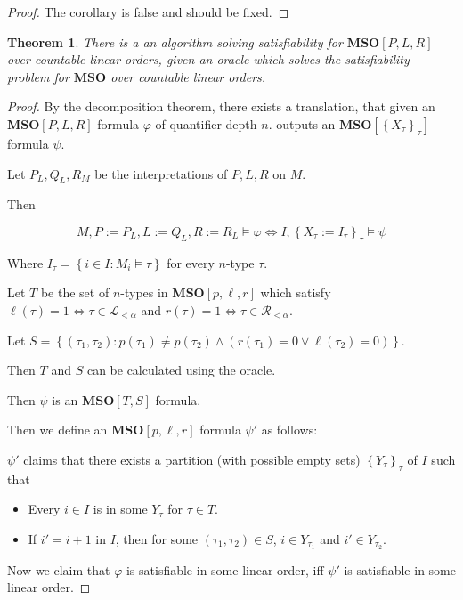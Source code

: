 \documentclass{article}
\newtheorem{theorem}{Theorem}
\newcommand{\braces}[1]{\left\{ {#1} \right\}}
\newcommand{\setcomp}[1]{\braces{#1}}
\newcommand{\mso}{\mathbf{MSO}}
\begin{document}
\begin{proof}
  The corollary is false and should be fixed.
\end{proof}

\begin{theorem}
  There is a an algorithm solving satisfiability for $\mso[P, L, R]$ over countable linear orders,
  given an oracle which solves the satisfiability problem for $\mso$ over countable linear orders.
\end{theorem}

\begin{proof}
  By the decomposition theorem, there exists a translation,
  that given an $\mso[P, L, R]$ formula $\varphi$ of quantifier-depth $n$.
  outputs an $\mso[\setcomp{X_\tau}_\tau]$ formula $\psi$.

  Let $P_L, Q_L, R_M$ be the interpretations of $P, L, R$ on $M$.

  Then

  $$
    M, P := P_L, L := Q_L, R := R_L \models \varphi \iff I, \setcomp{X_\tau := I_\tau}_\tau \models \psi
  $$

  Where $I_\tau = \setcomp{i \in I : M_i \models \tau}$ for every $n$-type $\tau$.

  Let $T$ be the set of $n$-types in $\mso[p, \ell, r]$ which satisfy
  $\ell(\tau) = 1 \iff \tau \in \mathcal{L}_{< \alpha}$ and $r(\tau) = 1 \iff \tau \in \mathcal{R}_{< \alpha}$.

  Let $S = \setcomp{(\tau_1, \tau_2) : p(\tau_1) \ne p(\tau_2) \land (r(\tau_1) = 0 \lor \ell(\tau_2) = 0)}$.

  Then $T$ and $S$ can be calculated using the oracle.

  Then $\psi$ is an $\mso[T, S]$ formula.

  Then we define an $\mso[p, \ell, r]$ formula $\psi'$ as follows:

  $\psi'$ claims that there exists a partition (with possible empty sets) $\setcomp{Y_\tau}_{\tau}$ of $I$ such that
  \begin{itemize}
    \item Every $i \in I$ is in some $Y_\tau$ for $\tau \in T$.
    \item If $i' = i+1$ in $I$, then for some $(\tau_1, \tau_2) \in S$, $i \in Y_{\tau_1}$ and $i' \in Y_{\tau_2}$.
  \end{itemize}

  Now we claim that $\varphi$ is satisfiable in some linear order, iff $\psi'$ is satisfiable in some
  linear order.


\end{proof}
\end{document}
